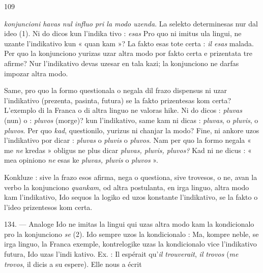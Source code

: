 \begin{VUpage}[113]{109}

\VUcontinue
\textit{konjuncioni havas nul influo pri la modo uzenda}. La selekto\nl
determinesas nur dal ideo (1). Ni do dicos kun l'indika\cc
tivo :  \textit{esas}  Pro\nl
quo ni imitus ula lingui, ne uzante l'indikativo kun « quan\cc
kam »? La fakto esas tote certa : \textit{il esas} malada. Per quo\nl
la konjunciono yurizas uzar altra modo por fakto certa e\nl
prizentata tre afirme? Nur l'indikativo devas uzesar en tala\nl
kazi; la konjunciono ne darfas impozar altra modo.

Same, pro quo la formo questionala o negala dil frazo\nl
dispensus ni uzar l'indikativo (prezenta, pasinta, futura)\nl
se la fakto prizentesas kom certa? L'exemplo di la Franca\nl
o di altra linguo ne valoras hike. Ni do dicos : \cc
{} \textit{pluvas} (nun) o : \textit{pluvos} (morge)? kun l'indikativo,\nl
same kam ni dicas : \textit{pluvas}, o \textit{pluvis}, o \textit{pluvos}. Per quo \textit{kad},\nl
questionilo, yurizus ni chanjar la modo? Fine, ni ankore\nl
uzos l'indikativo por dicar :  \textit{pluvas} o \textit{pluvis}\nl
o \textit{pluvos}. Nam per quo la formo negala « me \textit{ne} kredas »\nl
obligus ne plus dicar \textit{pluvas, pluvis, pluvos?} Kad ni ne dicus :\nl
« mea opiniono \textit{ne} esas ke \textit{pluvas, pluvis} o \textit{pluvos} ».

Konkluze : sive la frazo esos afirma, nega o questiona, sive\nl
trovesos, o ne, avan la verbo la konjunciono \textit{quankam}, od\nl
altra postulanta, en irga linguo, altra modo kam l'indikativo,\nl
Ido sequos la logiko ed uzos konstante l'indikativo, se la\nl
fakto o l'ideo prizentesos kom certa.

\VUblanc{8.68pt}%
134. --- Analoge Ido ne imitas la lingui qui uzas altra\nl
modo kam la kondicionalo pro la konjunciono \textit{se} (2). Ido\nl
sempre uzos la kondicionalo : \cc
{} Ma, kompre\cc
neble, se irga linguo, la Franca exemple, kontrelogike uzas\nl
la kondicionalo vice l'indikativo futura, Ido uzas l'indi\cc
kativo. Ex. : Il espérait qu'\textit{il trouverait},  \textit{il}\nl
\textit{trovos} (\textit{me trovos}, il dicis a su espere). Elle nous a écrit\parplein
\end{VUpage}

